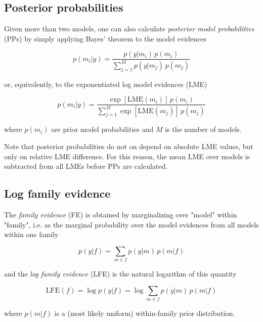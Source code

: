 \subsection{Posterior probabilities} \label{sec:MS-PPs}

Given more than two models, one can also calculate \textit{posterior model probabilities} (PPs) by simply applying Bayes' theorem to the model evidences

\begin{equation} \label{eq:PPs}
p(m_i|y) = \frac{p(y|m_i) \, p(m_i)}{\sum_{j=1}^M p(y|m_j) \, p(m_j)}
\end{equation}

or, equivalently, to the exponentiated log model evidences (LME)

\begin{equation} \label{eq:PPs-LME}
p(m_i|y) = \frac{\exp[\mathrm{LME}(m_i)] \, p(m_i)}{\sum_{j=1}^M \exp[\mathrm{LME}(m_j)] \, p(m_j)}
\end{equation}

where $p(m_i)$ are prior model probabilities and $M$ is the number of models.

\vspace{1em}
Note that posterior probabilities do not on depend on absolute LME values, but only on relative LME difference. For this reason, the mean LME over models is subtracted from all LMEs before PPs are calculated.


\pagebreak
\subsection{Log family evidence} \label{sec:MS-LFE}

The \textit{family evidence} (FE) is obtained by marginalizing over "model" within "family", i.e. as the marginal probability over the model evidences from all models within one family

\begin{equation} \label{eq:FE}
p(y|f) = \sum_{m \in f} p(y|m) \, p(m|f)
\end{equation}

and the \textit{log family evidence} (LFE) is the natural logarithm of this quantity

\begin{equation} \label{eq:LFE}
\mathrm{LFE}(f) = \log p(y|f) = \log \sum_{m \in f} p(y|m) \, p(m|f)
\end{equation}

where $p(m|f)$ is a (most likely uniform) within-family prior distribution.

